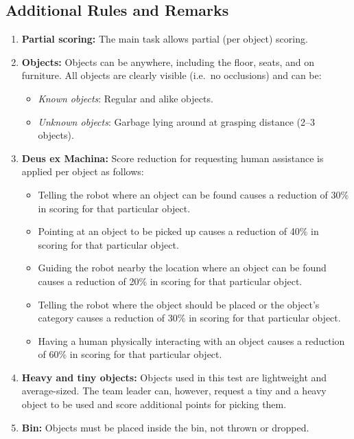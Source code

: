 \subsection*{Additional Rules and Remarks}
\begin{enumerate}[nosep]
	\item \textbf{Partial scoring:} The main task allows partial (per object) scoring.
	\item \textbf{Objects:}
	Objects can be anywhere, including the floor, seats, and on furniture.
	All objects are clearly visible (i.e.~no occlusions) and can be:
	\begin{itemize}[nosep]
		\item\textit{Known objects}: Regular and alike objects.
		\item\textit{Unknown objects}: Garbage lying around at grasping distance (2--3 objects).
	\end{itemize}

	\item \textbf{Deus ex Machina:} Score reduction for requesting human assistance is applied per object as follows:
	\begin{itemize}[nosep]
		\item Telling the robot where an object can be found causes a reduction of 30\% in scoring for that particular object.

		\item Pointing at an object to be picked up causes a reduction of 40\% in scoring for that particular object.

		\item Guiding the robot nearby the location where an object can be found causes a reduction of 20\% in scoring for that particular object.

		\item Telling the robot where the object should be placed or the object's category causes a reduction of 30\% in scoring for that particular object.

		\item Having a human physically interacting with an object causes a reduction of 60\% in scoring for that particular object.
	\end{itemize}

	\item \textbf{Heavy and tiny objects:} Objects used in this test are lightweight and average-sized.
	The team leader can, however, request a tiny and a heavy object to be used and score additional points for picking them.

	\item \textbf{Bin:} Objects must be placed inside the bin, not thrown or dropped.
\end{enumerate}

